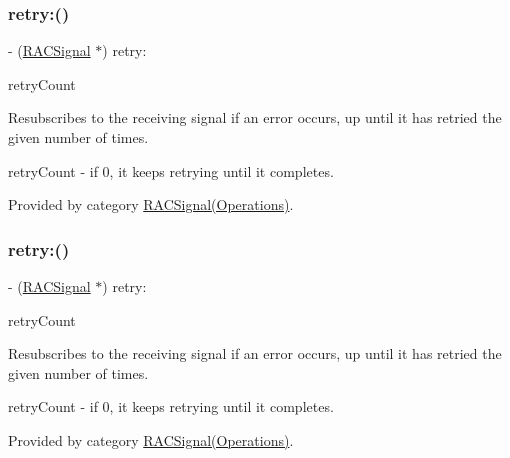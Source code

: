 \subsubsection{\texorpdfstring{retry\+:()}{retry:()}\hspace{0.1cm}{\footnotesize\ttfamily [1/3]}}
{\footnotesize\ttfamily -\/ (\mbox{\hyperlink{interface_r_a_c_signal}{R\+A\+C\+Signal}} $\ast$) retry\+: \begin{DoxyParamCaption}\item[{(N\+S\+Integer)}]{retry\+Count }\end{DoxyParamCaption}}

Resubscribes to the receiving signal if an error occurs, up until it has retried the given number of times.

retry\+Count -\/ if 0, it keeps retrying until it completes. 

Provided by category \mbox{\hyperlink{category_r_a_c_signal_07_operations_08_a3601540c46ceb34dbd1c242782022809}{R\+A\+C\+Signal(\+Operations)}}.

\mbox{\label{interface_r_a_c_signal_a3601540c46ceb34dbd1c242782022809}} 
\subsubsection{\texorpdfstring{retry\+:()}{retry:()}\hspace{0.1cm}{\footnotesize\ttfamily [2/3]}}
{\footnotesize\ttfamily -\/ (\mbox{\hyperlink{interface_r_a_c_signal}{R\+A\+C\+Signal}} $\ast$) retry\+: \begin{DoxyParamCaption}\item[{(N\+S\+Integer)}]{retry\+Count }\end{DoxyParamCaption}}

Resubscribes to the receiving signal if an error occurs, up until it has retried the given number of times.

retry\+Count -\/ if 0, it keeps retrying until it completes. 

Provided by category \mbox{\hyperlink{category_r_a_c_signal_07_operations_08_a3601540c46ceb34dbd1c242782022809}{R\+A\+C\+Signal(\+Operations)}}.

